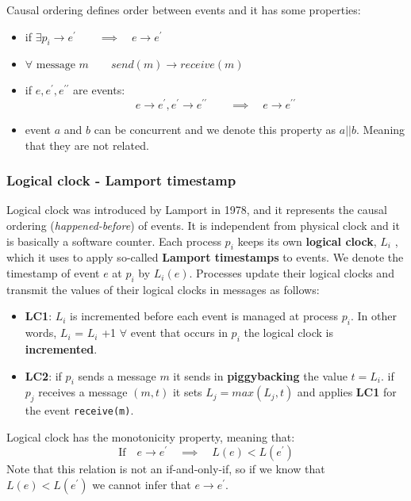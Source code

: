 \documentclass[11pt,a4paper]{article}
\begin{document}
Causal ordering defines order between events and it has some properties:
\begin{itemize}
	\item if $\exists p_i \rightarrow e^\prime \qquad \implies \quad e \rightarrow e^\prime$ 
	\item $\forall \text{ message } m \qquad send(m) \rightarrow receive(m)$
	\item if $e,e^\prime, e^{\prime\prime}$ are events:
	 $$e \rightarrow e^{\prime}, e^\prime \rightarrow e^{\prime\prime} \qquad \implies \quad e \rightarrow e^{\prime\prime}  $$
	 \item event $a$ and $b$ can be concurrent and we denote this property as $a || b$. Meaning that they are not related.
\end{itemize}

\subsubsection{Logical clock - Lamport timestamp}
Logical clock was introduced by Lamport in 1978, and it represents the causal ordering (\textit{happened-before}) of events. It is independent from physical clock and it is basically a software counter. Each process $p_i$ keeps its own \textbf{logical clock}, $L_i$ , which it uses to apply so-called \textbf{Lamport timestamps} to events. We denote the timestamp of event $e$ at $p_i$ by $L_i(e)$.
Processes update their logical clocks and transmit the values of their logical clocks in messages as follows:
\begin{itemize}
	\item \textbf{LC1}: $L_i$ is incremented before each event is managed at process $p_i$. In other words, $L_i$ = $L_i$ +1 $\forall$ event that occurs in $p_i$ the logical clock is \textbf{incremented}.
	\item \textbf{LC2}: if $p_i$ sends a message $m$ it sends in \textbf{piggybacking} the value $t = L_i$. if $p_j$ receives a message $(m,t)$ it sets $L_j = max(L_j, t)$ and applies \textbf{LC1} for the event \verb|receive(m)|.
\end{itemize}

Logical clock has the monotonicity property, meaning that:
$$\text{If} \quad e \rightarrow e^\prime \quad \implies \quad L(e) < L(e^\prime)$$
Note that this relation is not an if-and-only-if, so if we know that $L(e) < L(e^\prime)$ we cannot infer that $e \rightarrow e^\prime$. 
\end{document}

